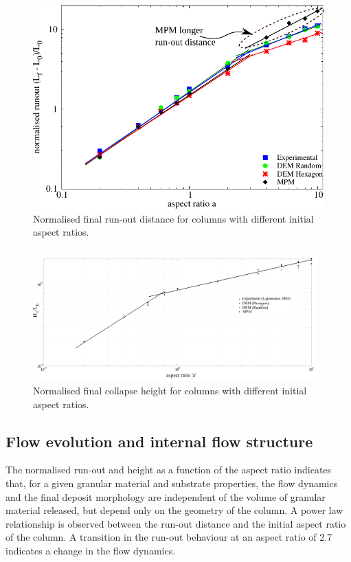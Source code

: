 \begin{figure}[tbhp]
\centering
\includegraphics[width=\textwidth]{runout}
\caption{Normalised final run-out distance for columns with different initial 
aspect ratios.}
\label{fig:run-out}
\end{figure}

\begin{figure}[tbhp]
\centering
\includegraphics[width=0.975\textwidth]{height}
\caption{Normalised final collapse height for columns with different initial 
aspect ratios.}
\label{fig:height}
\end{figure}

\subsection{Flow evolution and internal flow structure}

The normalised run-out and height as a function of the aspect ratio indicates 
that, for a given granular material and substrate properties, the flow dynamics 
and the final deposit morphology are independent of the volume of granular 
material released, but depend only on the geometry of the column. A 
power law relationship is observed between the run-out distance and the initial 
aspect ratio of the column. A transition in the run-out behaviour at an aspect 
ratio of 2.7 indicates a change in the flow dynamics. 

